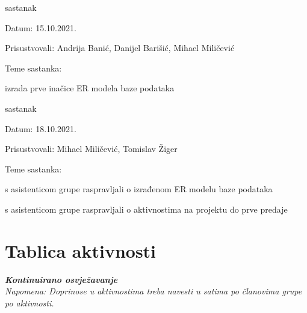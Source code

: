\begin{packed_enum}
			\item  sastanak
			\item[] \begin{packed_item}
				\item Datum: 15.10.2021.
				\item Prisustvovali: Andrija Banić, Danijel Barišić, Mihael Miličević
				\item Teme sastanka:
				\begin{packed_item}
					\item  izrada prve inačice ER modela baze podataka
				\end{packed_item}
			\end{packed_item}
			
			\item  sastanak
			\item[] \begin{packed_item}
				\item Datum: 18.10.2021.
				\item Prisustvovali: Mihael Miličević, Tomislav Žiger
				\item Teme sastanka:
				\begin{packed_item}
					\item  s asistenticom grupe raspravljali o izrađenom ER modelu baze podataka
					\item  s asistenticom grupe raspravljali o aktivnostima na projektu do prve predaje
				\end{packed_item}
			\end{packed_item}
			
			
		\end{packed_enum}
		
		\eject
		\section*{Tablica aktivnosti}
		
			\textbf{\textit{Kontinuirano osvježavanje}}\\
			
			 \textit{Napomena: Doprinose u aktivnostima treba navesti u satima po članovima grupe po aktivnosti.}

